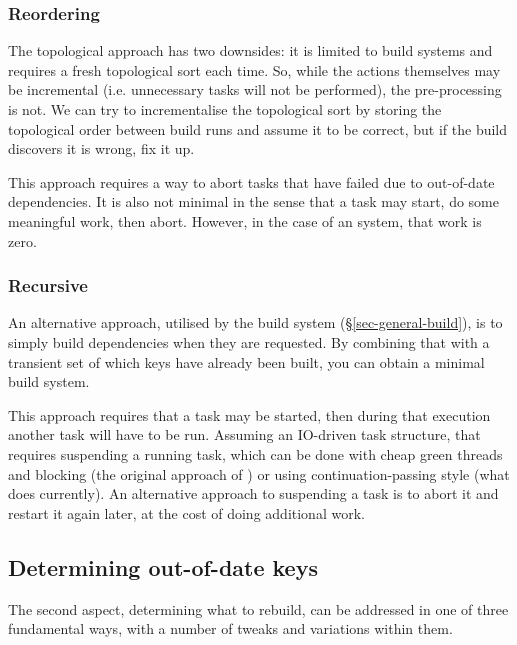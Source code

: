 \vspace{-2mm}
\subsubsection{Reordering}\label{sec-restarting}

The topological approach has two downsides: it is limited to 
build systems and requires a fresh topological sort each time.  So, while the
actions themselves may be incremental (i.e. unnecessary tasks will not be performed),
the pre-processing is not. We can try to incrementalise the topological sort by
storing the topological order between build runs and assume it to
be correct, but if the build discovers it is wrong, fix it up.

This approach requires a way to abort tasks that have failed due to out-of-date
dependencies. It is also not minimal in the sense that a task may start, do some
meaningful work, then abort. However, in the case of an  system,
that work is zero.

\vspace{-2mm}
\subsubsection{Recursive}\label{sec-suspending}

An alternative approach, utilised by the  build system
(\S\ref{sec-general-build}), is to simply build dependencies when they are
requested. By combining that with a transient set of which keys have already
been built, you can obtain a minimal build system.

This approach requires that a task may be started, then during that execution
another task will have to be run. Assuming an IO-driven task structure,
that requires suspending a running task, which can be done with cheap
green threads and blocking (the original approach of \Shake) or using
continuation-passing style (what \Shake does currently). An alternative approach to
suspending a task is to abort it and restart it again later, at the cost
of doing additional work.

\subsection{Determining out-of-date keys} \label{sec-out-of-date}

The second aspect, determining what to rebuild, can be addressed in one of three
fundamental ways, with a number of tweaks and variations within them.

